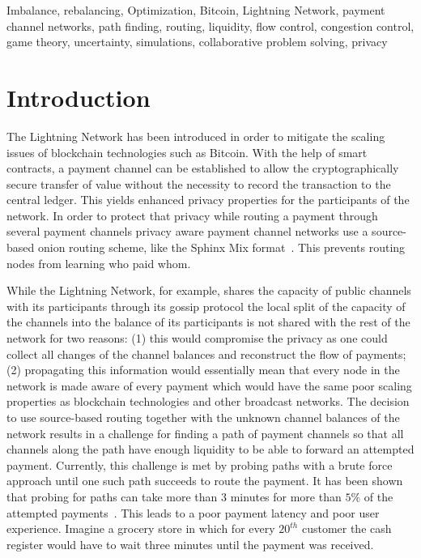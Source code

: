 \documentclass[conference]{IEEEtran}
\begin{document}
\begin{IEEEkeywords}
Imbalance, rebalancing, Optimization, Bitcoin, Lightning Network, payment channel networks, path finding, routing, liquidity, flow control, congestion control, game theory, uncertainty, simulations, collaborative problem solving, privacy 
\end{IEEEkeywords}



\section{Introduction}
The Lightning Network has been introduced in order to mitigate the scaling issues of blockchain technologies such as Bitcoin\cite{poon2016bitcoin}.
With the help of smart contracts, a payment channel can be established to allow the cryptographically secure transfer of value without the necessity to record the transaction to the central ledger.
This yields enhanced privacy properties for the participants of the network.
In order to protect that privacy while routing a payment through several payment channels privacy aware payment channel networks use a source-based onion routing scheme, like the Sphinx Mix format~\cite{danezis2009sphinx}.
This prevents routing nodes from learning who paid whom.

While the Lightning Network, for example, shares the capacity of public channels with its participants through its gossip protocol the local split of the capacity of the channels into the balance of its participants is not shared with the rest of the network for two reasons:
(1) this would compromise the privacy as one could collect all changes of the channel balances and reconstruct the flow of payments;
(2) propagating this information would essentially mean that every node in the network is made aware of every payment which would have the same poor scaling properties as blockchain technologies and other broadcast networks.
The decision to use source-based routing together with the unknown channel balances of the network results in a challenge for finding a path of payment channels so that all channels along the path have enough liquidity to be able to forward an attempted payment.
Currently, this challenge is met by probing paths with a brute force approach until one such path succeeds to route the payment.
It has been shown that probing for paths can take more than 3 minutes for more than $5\%$ of the attempted payments~\cite{decker2019lnconf}. This leads to a poor payment latency and poor user experience.
Imagine a grocery store in which for every $20^{th}$ customer the cash register would have to wait three minutes until the payment was received.
\end{document}
